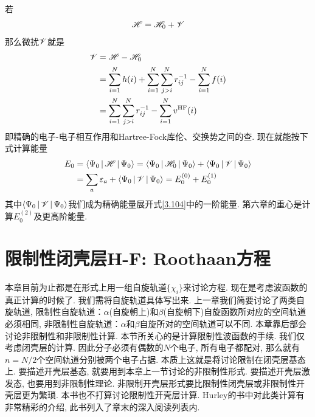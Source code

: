 若
\begin{align}
\mathscr{H} = \mathscr{H}_0 + \mathscr{V}
\end{align}
那么微扰$\mathscr{V}$就是
\begin{align}
\mathscr{V} & = \mathscr{H} -\mathscr{H}_0\notag\\
    & = \sum_{i=1}^{N}h(i) + \sum_{i=1}^{N}\sum_{j>i}^{N}r_{ij}^{-1} - \sum_{i=1}^{N}f(i)\notag\\
    & = \sum_{i=1}^{N}\sum_{j>i}^{N}r_{ij}^{-1} - \sum_{i=1}^{N}v^\mathrm{HF}(i)
    \label{3.108}
\end{align}
即精确的电子-电子相互作用和Hartree-Fock库伦、交换势之间的查. 现在就能按下式计算\hft 能量
\begin{align}
E_0 & = \Braket{\Psi_0|\mathscr{H}|\Psi_0} = \Braket{\Psi_0|\mathscr{H}_0|\Psi_0} + \Braket{\Psi_0|\mathscr{V}|\Psi_0} \notag\\
    & = \sum_a\varepsilon_a + \Braket{\Psi_0|\mathscr{V}|\Psi_0} = E_0^{(0)} + E_0^{(1)}
\end{align}
其中$\Braket{\Psi_0|\mathscr{V}|\Psi_0}$我们成为精确能量展开式\eqref{3.104}中的一阶能量. 第六章的重心是计算$E_0^{(2)}$及更高阶能量.
\section{限制性闭壳层H-F: Roothaan方程}
本章目前为止都是在形式上用一组自旋轨道$\{\chi_i\}$来讨论\hft 方程. 现在是考虑\hft 波函数的真正计算的时候了. 我们需将自旋轨道具体写出来. 上一章我们简要讨论了两类自旋轨道, 限制性自旋轨道：$\alpha$(自旋朝上)和$\beta$(自旋朝下)自旋函数所对应的空间轨道必须相同, 非限制性自旋轨道：$\alpha$和$\beta$自旋所对的空间轨道可以不同. 本章靠后部会讨论非限制性\hft 和非限制性\hft 计算. 本节所关心的是计算限制性\hft 波函数的手续. 我们仅考虑闭壳层的计算.
因此分子必须有偶数的$N$个电子, 所有电子都配对, 那么就有$n=N/2$个空间轨道分别被两个电子占据. 本质上这就是将讨论限制在闭壳层基态上. 要描述开壳层基态, 就要用到本章上一节讨论的非限制性形式. 要描述开壳层激发态, 也要用到非限制性\hft 理论. 非限制开壳层形式要比限制性闭壳层或非限制性开壳层更为繁琐. 本书也不打算讨论限制性开壳层\hft 计算. Hurley的书中对此类计算有非常精彩的介绍, 此书列入了章末的深入阅读列表内.
